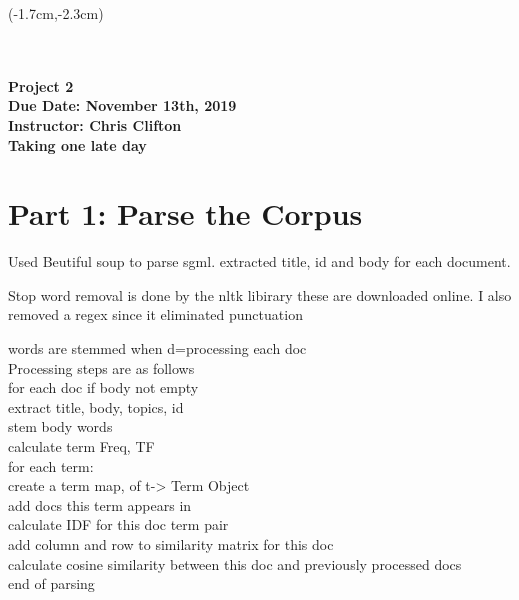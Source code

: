 \documentclass[12pt, oneside]{article}
\begin{document}


\begin{textblock*}{30cm}(-1.7cm,-2.3cm)
 \\
 \\
 \\
\end{textblock*}

\vspace{1cm}

\begin{center}
\textbf{\Large Project 2} \\ 
\textbf{Due Date: November 13th, 2019} \\
\textbf{Instructor: Chris Clifton}\\
\textbf{Taking one late day}\\
\end{center}

\section*{Part 1: Parse the Corpus}

Used Beutiful soup to parse sgml. extracted title, id and body for each document.

Stop word removal is done by the nltk libirary these are downloaded online.
I also removed a regex since it eliminated punctuation

words are stemmed when d=processing each doc\\
Processing steps are as follows\\
for each doc if body not empty\\
extract title, body, topics, id\\
stem body words\\
calculate term Freq, TF\\
for each term:\\
create a term map, of t-> Term Object\\
add docs this term appears in\\
calculate IDF for this doc term pair\\
add column and row to similarity matrix for this doc\\
calculate cosine similarity between this doc and previously processed docs\\
end of parsing\\
\end{document}
